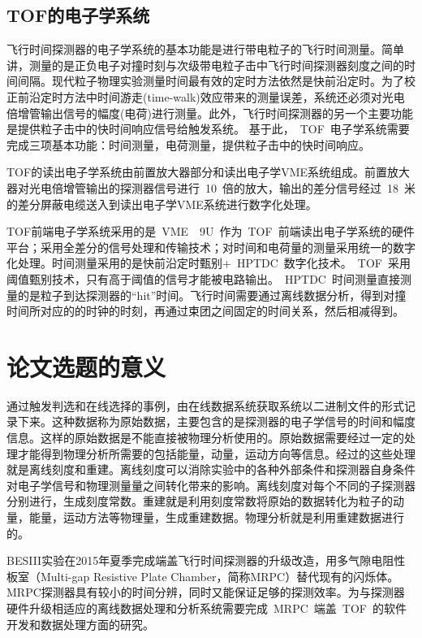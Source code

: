 \subsection{TOF的电子学系统}
飞行时间探测器的电子学系统的基本功能是进行带电粒子的飞行时间测量。简单讲，测量的是正负电子对撞时刻与次级带电粒子击中飞行时间探测器刻度之间的时间间隔。现代粒子物理实验测量时间最有效的定时方法依然是快前沿定时。为了校正前沿定时方法中时间游走(time-walk)效应带来的测量误差，系统还必须对光电倍增管输出信号的幅度(电荷)进行测量。此外，飞行时间探测器的另一个主要功能是提供粒子击中的快时间响应信号给触发系统。
基于此，~TOF~电子学系统需要完成三项基本功能：时间测量，电荷测量，提供粒子击中的快时间响应。

TOF的读出电子学系统由前置放大器部分和读出电子学VME系统组成。前置放大器对光电倍增管输出的探测器信号进行~10~倍的放大，输出的差分信号经过~18~米的差分屏蔽电缆送入到读出电子学VME系统进行数字化处理。

TOF前端电子学系统采用的是~VME$\quad$9U~作为~TOF~前端读出电子学系统的硬件平台；采用全差分的信号处理和传输技术；对时间和电荷量的测量采用统一的数字化处理。时间测量采用的是快前沿定时甄别+~HPTDC~数字化技术。~TOF~采用阈值甄别技术，只有高于阈值的信号才能被电路输出。~HPTDC~时间测量直接测量的是粒子到达探测器的“hit”时间。飞行时间需要通过离线数据分析，得到对撞时间所对应的的时钟的时刻，再通过束团之间固定的时间关系，然后相减得到。

\section{论文选题的意义}

通过触发判选和在线选择的事例，由在线数据系统获取系统以二进制文件的形式记录下来。这种数据称为原始数据，主要包含的是探测器的电子学信号的时间和幅度信息。这样的原始数据是不能直接被物理分析使用的。原始数据需要经过一定的处理才能得到物理分析所需要的包括能量，动量，运动方向等信息。经过的这些处理就是离线刻度和重建。离线刻度可以消除实验中的各种外部条件和探测器自身条件对电子学信号和物理测量量之间转化带来的影响。离线刻度对每个不同的子探测器分别进行，生成刻度常数。重建就是利用刻度常数将原始的数据转化为粒子的动量，能量，运动方法等物理量，生成重建数据。物理分析就是利用重建数据进行的。~\cite{wangyf2011ww}

BESIII实验在2015年夏季完成端盖飞行时间探测器的升级改造，用多气隙电阻性板室（Multi-gap Resistive Plate Chamber，简称MRPC）替代现有的闪烁体。MRPC探测器具有较小的时间分辨，同时又能保证足够的探测效率。为与探测器硬件升级相适应的离线数据处理和分析系统需要完成~MRPC~端盖~TOF~的软件开发和数据处理方面的研究。

